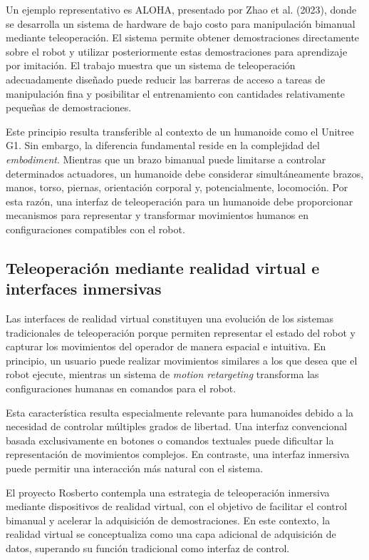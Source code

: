 \documentclass[stu,12pt,floatsintext]{apa7}
\begin{document}
Un ejemplo representativo es ALOHA, presentado por Zhao et al. (2023), donde se desarrolla un sistema de hardware de bajo costo para manipulación bimanual mediante teleoperación. El sistema permite obtener demostraciones directamente sobre el robot y utilizar posteriormente estas demostraciones para aprendizaje por imitación. El trabajo muestra que un sistema de teleoperación adecuadamente diseñado puede reducir las barreras de acceso a tareas de manipulación fina y posibilitar el entrenamiento con cantidades relativamente pequeñas de demostraciones.

Este principio resulta transferible al contexto de un humanoide como el Unitree G1. Sin embargo, la diferencia fundamental reside en la complejidad del \textit{embodiment}. Mientras que un brazo bimanual puede limitarse a controlar determinados actuadores, un humanoide debe considerar simultáneamente brazos, manos, torso, piernas, orientación corporal y, potencialmente, locomoción. Por esta razón, una interfaz de teleoperación para un humanoide debe proporcionar mecanismos para representar y transformar movimientos humanos en configuraciones compatibles con el robot.

\subsection{Teleoperación mediante realidad virtual e interfaces inmersivas}

Las interfaces de realidad virtual constituyen una evolución de los sistemas tradicionales de teleoperación porque permiten representar el estado del robot y capturar los movimientos del operador de manera espacial e intuitiva. En principio, un usuario puede realizar movimientos similares a los que desea que el robot ejecute, mientras un sistema de \textit{motion retargeting} transforma las configuraciones humanas en comandos para el robot.

Esta característica resulta especialmente relevante para humanoides debido a la necesidad de controlar múltiples grados de libertad. Una interfaz convencional basada exclusivamente en botones o comandos textuales puede dificultar la representación de movimientos complejos. En contraste, una interfaz inmersiva puede permitir una interacción más natural con el sistema.

El proyecto Rosberto contempla una estrategia de teleoperación inmersiva mediante dispositivos de realidad virtual, con el objetivo de facilitar el control bimanual y acelerar la adquisición de demostraciones. En este contexto, la realidad virtual se conceptualiza como una capa adicional de adquisición de datos, superando su función tradicional como interfaz de control.
\end{document}
